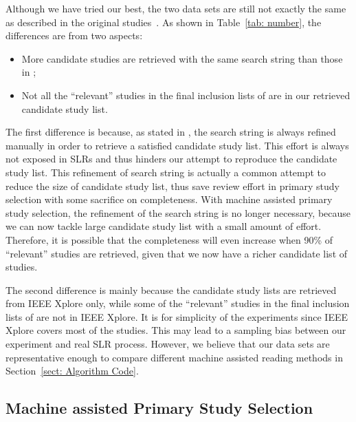 \documentclass[final,twocolumn,5p]{elsarticle}
\theoremstyle{break}
\begin{document}
Although we have tried our best, the two data sets are still not exactly the same as described in the original studies~\cite{wahono2015systematic,hall2012systematic}. As shown in Table~\ref{tab: number}, the differences are from two aspects: 

\begin{itemize}

\item
More candidate studies are retrieved with the same search string than those in \cite{wahono2015systematic,hall2012systematic};

\item
Not all the ``relevant'' studies in the final inclusion lists of \cite{wahono2015systematic,hall2012systematic} are in our retrieved candidate study list.

\end{itemize}

The first difference is because, as stated in \cite{wahono2015systematic}, the search string is always refined manually in order to retrieve a satisfied candidate study list. This effort is always not exposed in SLRs and thus hinders our attempt to reproduce the candidate study list. This refinement of search string is actually a common attempt to reduce the size of candidate study list, thus save review effort in primary study selection with some sacrifice on completeness. With machine assisted primary study selection, the refinement of the search string is no longer necessary, because we can now tackle large candidate study list with a small amount of effort. Therefore, it is possible that the completeness will even increase when 90\% of ``relevant'' studies are retrieved, given that we now have a richer candidate list of studies.

The second difference is mainly because the candidate study lists are retrieved from IEEE Xplore only, while some of the ``relevant'' studies in the final inclusion lists of \cite{wahono2015systematic,hall2012systematic} are not in IEEE Xplore. It is for simplicity of the experiments since IEEE Xplore covers most of the studies. This may lead to a sampling bias between our experiment and real SLR process. However, we believe that our data sets are representative enough to compare different machine assisted reading methods in Section~\ref{sect: Algorithm Code}.

\subsection{Machine assisted Primary Study Selection}
\label{subsect: Learning based Primary Study Selection}
\end{document}
